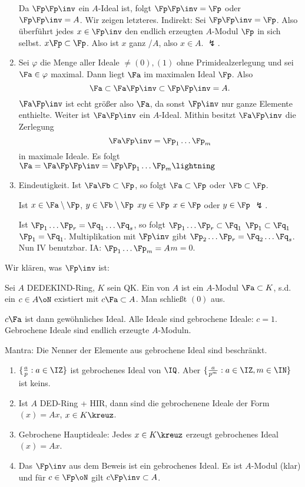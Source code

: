 \begin{Beweis}
\begin{enumerate}
  Da $\Fp\Fp\inv$ ein $A$-Ideal ist, folgt $\Fp\Fp\inv=\Fp$ oder  $\Fp\Fp\inv=A$. Wir zeigen letzteres. Indirekt: Sei $\Fp\Fp\inv=\Fp$. Also überführt jedes $x\in\Fp\inv$ den endlich erzeugten $A$-Modul $\Fp$ in sich selbst. $x\Fp\subset \Fp$. Also ist $x$ ganz /$A$, also $x\in A$. $\lightning$.

  \item Sei $\varphi$ die Menge aller Ideale $\neq (0),(1)$ ohne Primidealzerlegung und sei $\Fa\in\varphi$ maximal. Dann liegt $\Fa$ im maximalen Ideal $\Fp$. Also
  \[\Fa\subset \Fa\Fp\inv \subset \Fp\Fp\inv=A. \]
  $\Fa\Fp\inv$ ist echt größer also $\Fa$, da sonst $\Fp\inv$ nur ganze Elemente enthielte. Weiter ist $\Fa\Fp\inv$ ein $A$-Ideal. Mithin besitzt $\Fa\Fp\inv$ die Zerlegung
  \[\Fa\Fp\inv = \Fp_1\ldots\Fp_m \]
  in maximale Ideale. Es folgt $\Fa=\Fa\Fp\Fp\inv= \Fp\Fp_1\ldots\Fp_m\lightning$
  \item Eindeutigkeit. Ist $\Fa\Fb\subset\Fp$, so folgt $\Fa\subset \Fp$ oder $\Fb\subset\Fp$.
  
  Ist $x\in\Fa\setminus\Fp$, $y\in\Fb\setminus\Fp$ \folge $xy\in\Fp$ \folge $x\in\Fp$ oder $y\in\Fp$ $\lightning$.
  
  Ist $\Fp_1\ldots\Fp_r=\Fq_1\ldots\Fq_s$, so folgt $\Fp_1\ldots\Fp_r\subset \Fq_1$ \folge $\Fp_1\subset\Fq_1$ \folge $\Fp_1=\Fq_1$.
  Multiplikation mit $\Fp\inv$ gibt $\Fp_2\ldots\Fp_r=\Fq_2\ldots\Fq_s$. Nun IV benutzbar. IA: $\Fp_1\ldots\Fp_m=A$\folge $m=0$.
 \end{enumerate}
\end{Beweis}

Wir klären, was $\Fp\inv$ ist:

\begin{Definition}
 Sei $A$ DEDEKIND-Ring, $K$ sein QK. Ein  von $A$ ist ein $A$-Modul $\Fa\subset K$, s.d. ein $c\in A\oN$ existiert
mit $c\Fa\subset A$. Man schließt $(0)$ aus.
 \end{Definition}

\begin{Bemerkung}
 $c\Fa$ ist dann gewöhnliches Ideal. Alle Ideale sind gebrochene Ideale: $c=1$. Gebrochene Ideale sind endlich erzeugte $A$-Moduln.

 Mantra: Die Nenner der Elemente aus gebrochene Ideal sind beschränkt.
\end{Bemerkung}

\begin{Beispiel}
 \begin{enumerate}
  \item $\{\frac{a}{p}: a\in\IZ \}$ ist gebrochenes Ideal von $\IQ$. Aber $\{ \frac{a}{p^m}: a\in\IZ, m\in \IN\}$ ist keins.
  \item Ist $A$ DED-Ring + HIR, dann sind die gebrochenene Ideale der Form $(x)=Ax$, $x\in K\kreuz$.
  \item Gebrochene Hauptideale: Jedes $x\in K\kreuz$ erzeugt gebrochenes Ideal $(x)=Ax$.
  \item Das $\Fp\inv$ aus dem Beweis ist ein gebrochenes Ideal. Es ist $A$-Modul (klar) und für $c\in\Fp\oN$ gilt $c\Fp\inv\subset A$.
 \end{enumerate}
\end{Beispiel}


